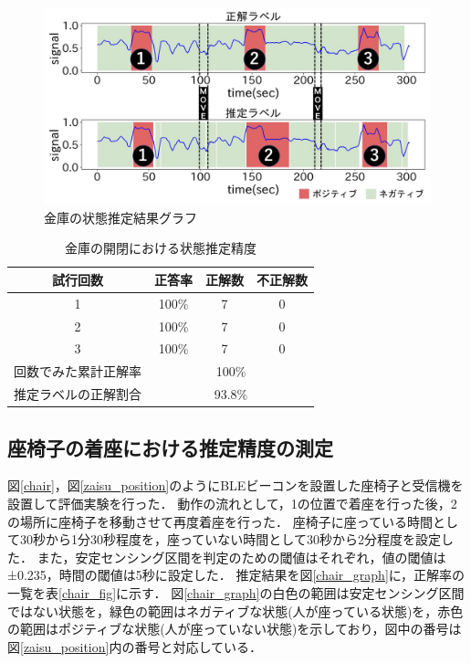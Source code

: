 \begin{figure}[tbh]
    \centering
    \includegraphics[width=14cm]{images/chapter3/kinko_graph.jpg}
    \caption{金庫の状態推定結果グラフ}
    \label{kinko_graph}
\end{figure}

\begin{table}[tbh]
    \begin{center}
        \caption{金庫の開閉における状態推定精度}
        \label{kinko_fig}
        \begin{tabular}{|c|c|c|c|} \hline
        試行回数 & 正答率 & 正解数 & 不正解数 \\ \hline
        1 & 100\% & 7 & 0 \\ \hline
        2 & 100\% & 7 & 0 \\ \hline
        3 & 100\% & 7 & 0 \\ \hline \hline
        回数でみた累計正解率 & \multicolumn{3}{c|}{100\%} \\ \hline \hline
        推定ラベルの正解割合 & \multicolumn{3}{c|}{93.8\%} \\ \hline
        \end{tabular}
    \end{center}
\end{table}


\subsection{座椅子の着座における推定精度の測定}
図\ref{chair}，図\ref{zaisu_position}のようにBLEビーコンを設置した座椅子と受信機を設置して評価実験を行った．
動作の流れとして，1の位置で着座を行った後，2の場所に座椅子を移動させて再度着座を行った．
座椅子に座っている時間として30秒から1分30秒程度を，座っていない時間として30秒から2分程度を設定した．
また，安定センシング区間を判定のための閾値はそれぞれ，値の閾値は±0.235，時間の閾値は5秒に設定した．
推定結果を図\ref{chair_graph}に，正解率の一覧を表\ref{chair_fig}に示す．
図\ref{chair_graph}の白色の範囲は安定センシング区間ではない状態を，緑色の範囲はネガティブな状態(人が座っている状態)を，赤色の範囲はポジティブな状態(人が座っていない状態)を示しており，図中の番号は図\ref{zaisu_position}内の番号と対応している．

